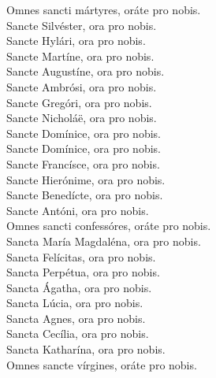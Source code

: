 {	%
	Omnes sancti mártyres, oráte pro nobis. \\
	Sancte Silvéster, ora pro nobis. \\
		Sancte Hylári, ora pro nobis. \\
	Sancte Martíne, ora pro nobis. \\
	Sancte Augustíne, ora pro nobis. \\
	Sancte Ambrósi, ora pro nobis. \\
	Sancte Gregóri, ora pro nobis. \\
	Sancte Nicholáë, ora pro nobis. \\
	Sancte Domínice, ora pro nobis. \\
	Sancte Domínice, ora pro nobis. \\%
	Sancte Francísce, ora pro nobis. \\
	Sancte Hierónime, ora pro nobis. \\
	Sancte Benedícte, ora pro nobis. \\
	Sancte Antóni, ora pro nobis. \\
		Omnes sancti confessóres, oráte pro nobis. \\
	Sancta María Magdaléna, ora pro nobis. \\
		Sancta Felícitas, ora pro nobis. \\
		Sancta Perpétua, ora pro nobis. \\
	Sancta Ágatha, ora pro nobis. \\
	Sancta Lúcia, ora pro nobis. \\
	Sancta Agnes, ora pro nobis. \\
	Sancta Cecília, ora pro nobis. \\
	Sancta Katharína, ora pro nobis. \\
		Omnes sancte vírgines, oráte pro nobis. \\
}
